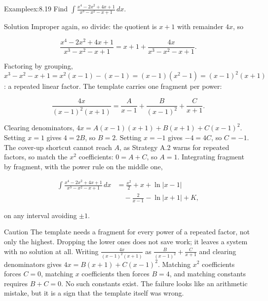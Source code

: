\documentclass[a4paper,12pt,oneside]{memoir}
\begin{document}
\begin{workedexample}
\begin{envexample}{Example}{ex:8.19}{}
Find \(\displaystyle\int \frac{x^{4} - 2x^{2} + 4x + 1}{x^{3} - x^{2} - x + 1}\,dx\).
\end{envexample}
\begin{envsolution}{Solution}{}{}
Improper again, so divide: the quotient is \(x + 1\) with remainder \(4x\), so

\[ \frac{x^{4} - 2x^{2} + 4x + 1}{x^{3} - x^{2} - x + 1} = x + 1 + \frac{4x}{x^{3} - x^{2} - x + 1}. \]

Factoring by grouping, \(x^{3} - x^{2} - x + 1 = x^{2}(x - 1) - (x - 1) = (x - 1)(x^{2} - 1) = (x - 1)^{2}(x + 1)\): a repeated linear factor. The template carries one fragment per power:

\[ \frac{4x}{(x - 1)^{2}(x + 1)} = \frac{A}{x - 1} + \frac{B}{(x - 1)^{2}} + \frac{C}{x + 1}. \]

Clearing denominators, \(4x = A(x - 1)(x + 1) + B(x + 1) + C(x - 1)^{2}\). Setting \(x = 1\) gives \(4 = 2B\), so \(B = 2\). Setting \(x = -1\) gives \(-4 = 4C\), so \(C = -1\). The cover-up shortcut cannot reach \(A\), as Strategy A.2 warns for repeated factors, so match the \(x^{2}\) coefficients: \(0 = A + C\), so \(A = 1\). Integrating fragment by fragment, with the power rule on the middle one,

\[ \begin{aligned}
          \int \frac{x^{4} - 2x^{2} + 4x + 1}{x^{3} - x^{2} - x + 1}\,dx &= \frac{x^{2}}{2} + x + \ln\lvert x - 1\rvert \\
            &\quad - \frac{2}{x - 1} - \ln\lvert x + 1\rvert + K,
        \end{aligned} \]

on any interval avoiding \(\pm 1\). \qedmark
\end{envsolution}
\end{workedexample}
\begin{envcaution}{Caution}{}{}
The template needs a fragment for every power of a repeated factor, not only the highest. Dropping the lower ones does not save work; it leaves a system with no solution at all. Writing \(\frac{4x}{(x - 1)^{2}(x + 1)}\) as \(\frac{B}{(x - 1)^{2}} + \frac{C}{x + 1}\) and clearing denominators gives \(4x = B(x + 1) + C(x - 1)^{2}\). Matching \(x^{2}\) coefficients forces \(C = 0\), matching \(x\) coefficients then forces \(B = 4\), and matching constants requires \(B + C = 0\). No such constants exist. The failure looks like an arithmetic mistake, but it is a sign that the template itself was wrong.
\end{envcaution}
\end{document}
